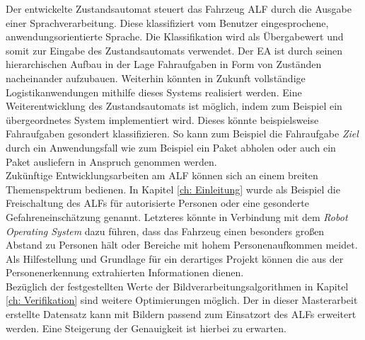 Der entwickelte Zustandsautomat steuert das Fahrzeug ALF durch die Ausgabe einer Sprachverarbeitung. Diese klassifiziert vom Benutzer eingesprochene, anwendungsorientierte Sprache. Die Klassifikation wird als Übergabewert und somit zur Eingabe des Zustandsautomats verwendet. Der EA ist durch seinen hierarchischen Aufbau in der Lage Fahraufgaben in Form von Zuständen nacheinander aufzubauen. Weiterhin könnten in Zukunft vollständige Logistikanwendungen mithilfe dieses Systems realisiert werden. Eine Weiterentwicklung des Zustandsautomats ist möglich, indem zum Beispiel ein übergeordnetes System implementiert wird. Dieses könnte beispielsweise Fahraufgaben gesondert klassifizieren. So kann zum Beispiel die Fahraufgabe \textit{Ziel} durch ein Anwendungsfall wie zum Beispiel ein Paket abholen oder auch ein Paket ausliefern in Anspruch genommen werden.\\


Zukünftige Entwicklungsarbeiten am ALF können sich an einem breiten Themenspektrum bedienen. In Kapitel \ref{ch: Einleitung} wurde als Beispiel die Freischaltung des ALFs für autorisierte Personen oder eine gesonderte Gefahreneinschätzung genannt. Letzteres könnte in Verbindung mit dem \textit{Robot Operating System} dazu führen, dass das Fahrzeug einen besonders großen Abstand zu Personen hält oder Bereiche mit hohem Personenaufkommen meidet. Als Hilfestellung und Grundlage für ein derartiges Projekt können die aus der Personenerkennung extrahierten Informationen dienen. \\

Bezüglich der festgestellten Werte der Bildverarbeitungsalgorithmen in Kapitel \ref{ch: Verifikation} sind weitere Optimierungen möglich. Der in dieser Masterarbeit erstellte Datensatz kann mit Bildern passend zum Einsatzort des ALFs erweitert werden. Eine Steigerung der Genauigkeit ist hierbei zu erwarten.\\





